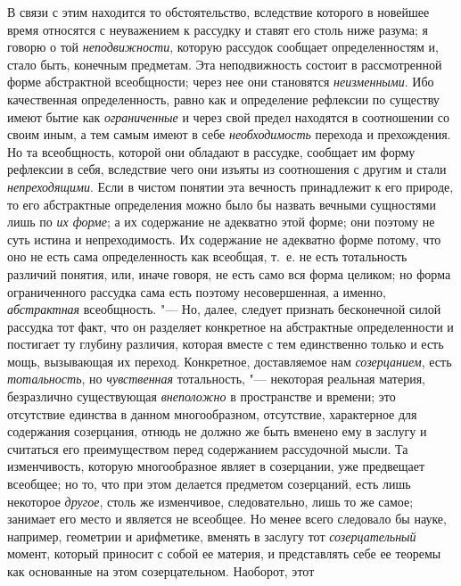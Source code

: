 В связи с этим находится то обстоятельство, вследствие
которого в новейшее время относятся с неуважением к рассудку и ставят его
столь ниже
разума;
я говорю о той
{\em неподвижности},
которую рассудок сообщает определенностям и, стало быть,
конечным предметам. Эта неподвижность состоит в рассмотренной форме
абстрактной всеобщности; через нее они становятся
{\em неизменными}. Ибо
качественная определенность, равно как и определение рефлексии по существу
имеют бытие как {\em ограниченные}
и через свой предел находятся в соотношении со своим иным,
а тем самым имеют в себе
{\em необходимость}
перехода и прехождения. Но та всеобщность, которой они
обладают в рассудке, сообщает им форму рефлексии в себя, вследствие чего
они изъяты из соотношения с другим и стали
{\em непреходящими}. Если
в чистом понятии эта вечность принадлежит к его природе, то его абстрактные
определения можно было бы назвать вечными сущностями лишь по
{\em их форме}; а их
содержание не адекватно этой форме; они поэтому не суть
истина и непреходимость. Их содержание не адекватно форме потому, что оно
не есть сама определенность как всеобщая, т.~е. не есть тотальность
различий понятия, или, иначе говоря, не есть само вся форма целиком; но
форма ограниченного рассудка сама есть поэтому несовершенная, а именно,
{\em абстрактная}
всеобщность. "--- Но, далее, следует признать
бесконечной силой рассудка тот факт, что он разделяет конкретное на
абстрактные определенности и постигает ту глубину различия, которая вместе
с тем единственно только и есть мощь, вызывающая их переход. Конкретное,
доставляемое нам {\em созерцанием},
есть {\em тотальность},
но {\em чувственная}
тотальность, "--- некоторая реальная материя,
безразлично существующая
{\em внеположно} в
пространстве и времени; это отсутствие единства в данном многообразном,
отсутствие, характерное для содержания созерцания, отнюдь не должно же быть
вменено ему в заслугу и считаться его преимуществом перед содержанием
рассудочной мысли. Та изменчивость, которую многообразное являет в
созерцании, уже предвещает всеобщее; но то, что при этом делается предметом
созерцаний, есть лишь некоторое
{\em другое}, столь же
изменчивое, следовательно, лишь то же самое; занимает его место и является
не всеобщее. Но менее всего следовало бы науке, например, геометрии и
арифметике, вменять в заслугу тот
{\em созерцательный}
момент, который приносит с собой ее материя, и представлять
себе ее теоремы как основанные на этом созерцательном. Наоборот, этот
